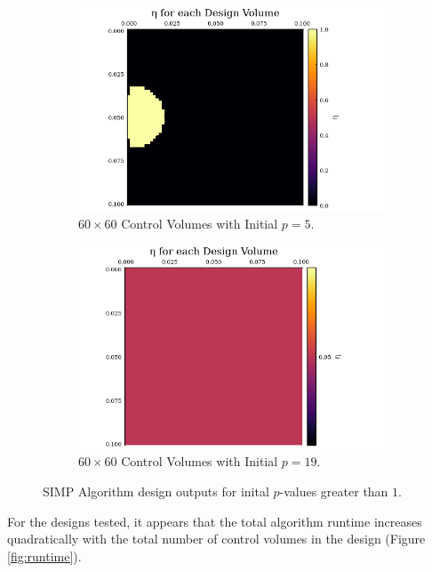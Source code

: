 \begin{figure}
	\begin{subfigure}{0.5\textwidth}
		\includegraphics[width=1.1\linewidth]{Chapter_III_Implementation_and_Results/Images/60x60-start-p=5-1iters.png}
		\caption{$60\times 60$ Control Volumes with Initial $p=5$.}
		\label{fig:start_p=5}
	\end{subfigure}
	\begin{subfigure}{0.5\textwidth}
	\includegraphics[width=1.1\linewidth]{Chapter_III_Implementation_and_Results/Images/60x60-start-p=19-3iters.png}
	\caption{$60\times 60$ Control Volumes with Initial $p=19$.}
	\label{fig:start_p=19}
\end{subfigure}
\caption[Designs with Higher Initial $p$]{SIMP Algorithm design outputs for inital $p$-values greater than $1$.}
\end{figure}

For the designs tested, it appears that the total algorithm runtime increases quadratically with the total number of control volumes in the design (Figure \ref{fig:runtime}).

